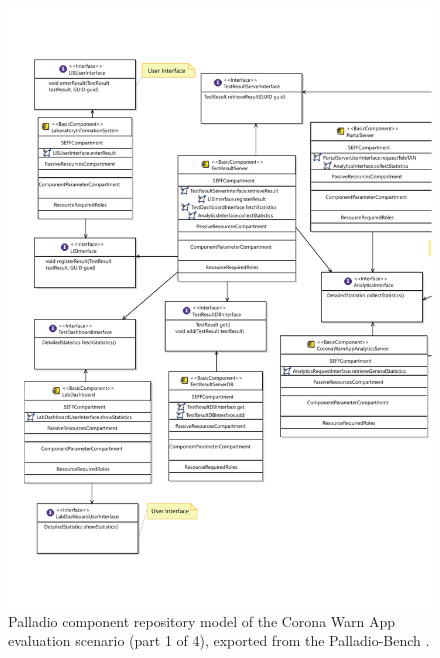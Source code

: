 \begin{figure}
    \centering
    \includegraphics[width=\textwidth]{figures/chapter12/cwa1.pdf}
    \caption[Palladio component repository model of the Corona Warn App evaluation scenario (part 1 of 4).]{Palladio component repository model of the Corona Warn App evaluation scenario (part 1 of 4), exported from the Palladio-Bench \cite{reussner_palladio_2024}.}
    \label{fig:appendix:cwa:1}
\end{figure}

